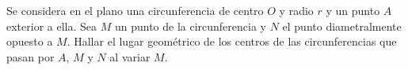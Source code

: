 Se considera en el plano una circunferencia de centro $O$ y radio $r$ y un punto $A$ exterior a ella. Sea $M$ un punto de la circunferencia y $N$ el punto diametralmente opuesto a $M$. Hallar el lugar geométrico de los centros de las circunferencias que pasan por $A$, $M$ y $N$ al variar $M$.
